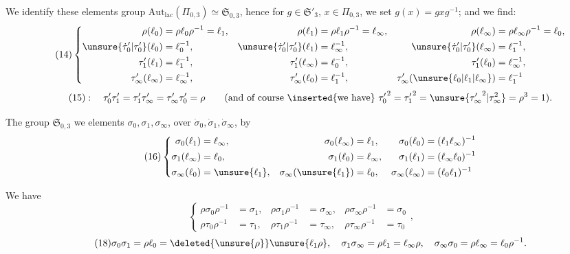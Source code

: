 \quad{}
We identify these elements   group
$\mathrm{Aut}_{\mathrm{lac}}(\Pi_{0,3})\simeq\mathfrak S_{0,3}$,
hence  for $g\in\mathfrak S'_3$, $x\in\Pi_{0,3}$, we set
$g(x)=gxg^{-1}$; and we find:
\[
\tag{14}
\left\{\begin{aligned}
\rho(\ell_0)&=\rho\ell_0\rho^{-1}=\ell_1,&
\rho(\ell_1)&=\rho\ell_1\rho^{-1}=\ell_\infty,&
\rho(\ell_\infty)&=\rho\ell_\infty\rho^{-1}=\ell_0,\\
\unsure{\dot\tau'_0|\tau'_0}(\ell_0)&=\ell_0^{-1},&
\unsure{\dot\tau'_0|\tau'_0}(\ell_1)&=\ell_\infty^{-1},&
\unsure{\dot\tau'_0|\tau'_0}(\ell_\infty)&=\ell_1^{-1},\\
\tau'_1(\ell_1)&=\ell_1^{-1},&
\tau'_1(\ell_\infty)&=\ell_0^{-1},&
\tau'_1(\ell_0)&=\ell_\infty^{-1},\\
\tau'_\infty(\ell_\infty)&=\ell_\infty^{-1},&
\tau'_\infty(\ell_0)&=\ell_1^{-1},&
\tau'_\infty(\unsure{\ell_0|\ell_1|\ell_\infty})&=\ell_1^{-1}
\end{aligned}\right.
\]
\[
\tag{15}
:\quad\tau'_0\tau'_1=\tau'_1\tau'_\infty=\tau'_\infty\tau'_0=\rho
\qquad\text{(and of course \inserted{we have} }{\tau'_0}^{2}={\tau'_1}^{2}=\unsure{{\tau'_\infty}^{2}|\tau_\infty^{2}}=\rho^3=1\text{).}
\]

 The group $\mathfrak S_{0,3}$ we  elements
$\sigma_0,\sigma_1,\sigma_\infty$, over $\dot\sigma_0,\dot\sigma_1,\dot\sigma_\infty$, by
\[
\tag{16}
\left\{\begin{aligned}
\sigma_0(\ell_1)&=\ell_\infty,& \sigma_0(\ell_\infty)&=\ell_1,& \sigma_0(\ell_0)&=(\ell_1\ell_\infty)^{-1}\\
\sigma_1(\ell_\infty)&=\ell_0,& \sigma_1(\ell_0)&=\ell_\infty,& \sigma_1(\ell_1)&=(\ell_\infty\ell_0)^{-1}\\
\sigma_\infty(\ell_0)&=\unsure{\ell_1},& \sigma_\infty(\unsure{\ell_1})&=\ell_0,& \sigma_\infty(\ell_\infty)&=(\ell_0\ell_1)^{-1}
\end{aligned}\right.
\]

We have
\[
\tag{17}
\left\{\begin{aligned}
\rho\sigma_0\rho^{-1}&=\sigma_1,& \rho\sigma_1\rho^{-1}&=\sigma_\infty,& \rho\sigma_\infty\rho^{-1}&=\sigma_0\\
\rho\tau_0\rho^{-1}&=\tau_1,& \rho\tau_1\rho^{-1}&=\tau_\infty,& \rho\tau_\infty\rho^{-1}&=\tau_0
\end{aligned}\right.,
\]
\[
\tag{18}
\sigma_0\sigma_1=\rho\ell_0=\deleted{\unsure{\rho}}\unsure{\ell_1\rho},\quad
\sigma_1\sigma_\infty=\rho\ell_1=\ell_\infty\rho,\quad
\sigma_\infty\sigma_0=\rho\ell_\infty=\ell_0\rho^{-1}.
\]

